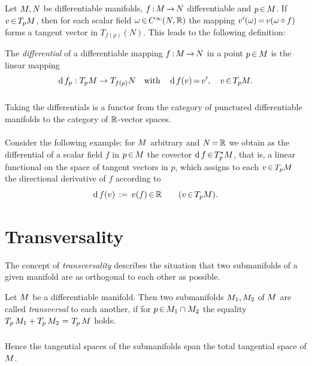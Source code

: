 \documentclass[11pt,twoside]{article}
\begin{document}
\subparagraph{}
Let ${M},{N}$ be differentiable manifolds,
$f {\,:\,} {M} {\,\to\,} {N}$ differentiable and $p {\,\in\,} {M}$.
If $v {\,\in\,} T_p {M}$,
then for each scalar field $\omega {\,\in\,} C^{\infty}(N,{\mathbb{R}})$
the mapping $v'(\omega) {\,=\,} v(\omega \circ f)$
forms a tangent vector in $T_{f(p)}(N)$.
This leads to the following definition:

\begin{definition}
The \textit{differential} of a differentiable mapping
$f {\,:\,} {M} {\,\to\,} {N}$ in a point $p {\,\in\,} {M}$
is the {linear mapping}
\[
\operatorname{d}f_p : T_p {M} \to T_{f(p)} N \quad \mbox{with}
\quad \operatorname{d}f(v) {\,=\,} v', \quad v {\,\in\,} T_p {M}.
\]
\end{definition}

\subparagraph{}
Taking the differentials is a functor
from the category of punctured differentiable manifolds
to the category of ${\mathbb{R}}$-vector spaces.

\paragraph{}
Consider the following example:
for ${M}$ arbitrary and ${N} {\,=\,} {\mathbb{R}}$
we obtain as the differential of a scalar field $f$
in $p {\,\in\,} {M}$ the covector $\operatorname{d}f {\,\in\,} T_p^\star {M}$,
that is,
a linear functional on the space of tangent vectors in $p$,
which assigns to each $v {\,\in\,} T_p {M}$ the directional derivative of $f$
according to
\[
\operatorname{d}f(v) \,:=\, v(f) {\,\in\,} {\mathbb{R}} \qquad (v {\,\in\,} T_p {M}).
\]

\section{Transversality}
The concept of \textit{transversality} describes the situation
that two submanifolds of a given manifold are as orthogonal to each other
as possible.

\begin{definition}
Let ${M}$ be a differentiable manifold.
Then two submanifolds ${M}_1,{M}_2$ of ${M}$
are called \textit{transversal} to each another,
if for $p {\,\in\,} {M}_1 \cap {M}_2$
the equality $T_p\,{M}_1 + T_p\,{M}_2 \, {\,=\,} \, T_p\,{M}$ holds.
\end{definition}

\subparagraph{}
Hence the tangential spaces of the submanifolds span
the total tangential space of ${M}$.
\end{document}
